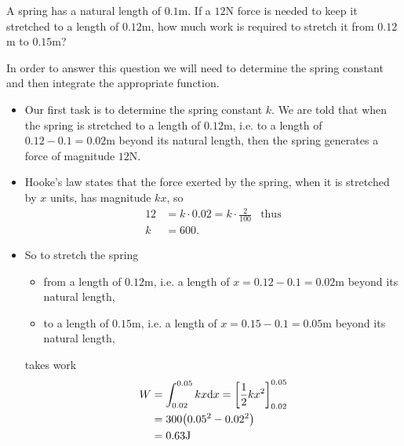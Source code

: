 \begin{eg}[Spring]\label{eg:WKspring}
A spring has a natural length of $0.1$m. If a $12$N force is
needed to keep it stretched to a length of $0.12$m, how much work
is required to stretch it from $0.12$m to $0.15$m?

\soln In order to answer this question we will need to determine the spring constant and
then integrate the appropriate function.
\begin{itemize}
 \item Our first task is to determine the spring constant $k$. We are
told that when the spring is stretched to a length of $0.12$m,
i.e. to a length of $0.12-0.1=0.02$m beyond its natural length,
then the spring generates a force of magnitude $12$N.
\item Hooke's law states that the force exerted by the spring,
when it is stretched by $x$ units, has magnitude $k x$, so
\begin{align*}
  12 &= k \cdot 0.02 = k \cdot \frac{2}{100} & \text{thus}\\
  k &=600.
\end{align*}

\item So to stretch the spring
\begin{itemize}
\item
from a length of $0.12$m,
i.e. a length of $x=0.12-0.1=0.02$m beyond its natural length,
\item
to a length of $0.15$m,
i.e. a length of $x=0.15-0.1=0.05$m beyond its natural length,
\end{itemize}
takes work
\begin{align*}
W &=\int_{0.02}^{0.05} k x \mathrm{d}x
=  \left[\frac{1}{2}kx^2\right]_{0.02}^{0.05}\\
&=300\big(0.05^2-0.02^2\big)\\
&=0.63\mathrm{J}
\end{align*}
\end{itemize}
\end{eg}

